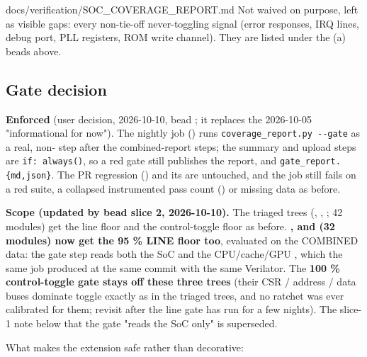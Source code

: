 \begin{relocated}{docs/verification/SOC_COVERAGE_REPORT.md}
Not waived on purpose, left as visible gaps: every non-tie-off
never-toggling signal (error responses, IRQ lines, debug port, PLL
registers, ROM write channel). They are listed under the (a) beads
above.

\subsection{Gate decision}\label{tm:flow:soc-coverage-report:gate-decision}

\textbf{Enforced} (user decision, 2026-10-10, bead ; it
replaces the 2026-10-05 "informational for now"). The nightly
 job () runs
\texttt{coverage\_\allowbreak{}report.\allowbreak{}py\ -\allowbreak{}-\allowbreak{}gate}
as a real, non- step after the combined-report
steps; the summary and upload steps are
\texttt{if:\allowbreak{}\ always()}, so a red gate still publishes the
report,  and
\texttt{gate\_\allowbreak{}report.\allowbreak{}\{md,\allowbreak{}json\}}.
The PR regression () and its  are
untouched, and the job still fails on a red suite, a collapsed
instrumented pass count () or missing data as before.

\textbf{Scope (updated by bead  slice 2, 2026-10-10).} The
triaged trees (, , ; 42
modules) get the line floor and the control-toggle floor as before.
\textbf{,  and  (32 modules) now
get the 95 \% LINE floor too}, evaluated on the COMBINED data: the gate
step reads both the SoC  and the
CPU/\allowbreak{}cache/\allowbreak{}GPU , which
the same job produced at the same commit with the same Verilator. The
\textbf{100 \% control-toggle gate stays off these three trees} (their
CSR / address / data buses dominate toggle exactly as in the triaged
trees, and no ratchet was ever calibrated for them; revisit after the
line gate has run for a few nights). The slice-1 note below that the
gate "reads the SoC  only" is superseded.

What makes the extension safe rather than decorative:


\end{relocated}
